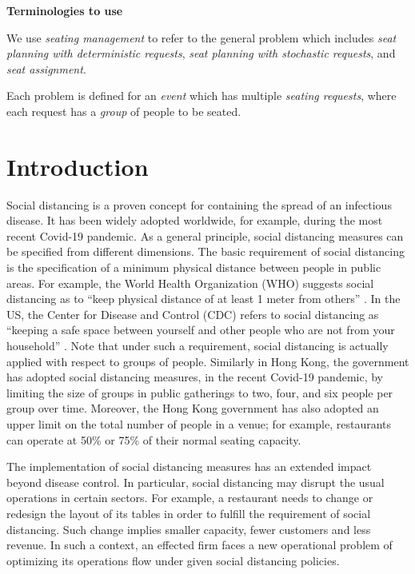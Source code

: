 
{\bf Terminologies to use}

We use {\em seating management} to refer to the general problem which includes {\em seat planning with deterministic requests}, 
{\em seat planning with stochastic requests}, and {\em seat assignment}.

Each problem is defined for an {\em event} which has multiple {\em seating requests}, where each request has a {\em group} of people to be seated.

\section{Introduction}
Social distancing is a proven concept for containing the spread of an infectious disease. It has been widely adopted worldwide, for example, during the most recent Covid-19 pandemic. As a general principle, social distancing measures can be specified from different dimensions. The basic requirement of social distancing is the specification of a minimum physical distance between people in public areas. For example, the World Health Organization (WHO) suggests social distancing as to ``keep physical distance of at least 1 meter from others'' \cite{AdviceforPublic}. In the US, the Center for Disease and Control (CDC) refers to social distancing as ``keeping a safe space between yourself and other people who are not from your household'' \cite{CDC}. 
Note that under such a requirement, social distancing is actually applied with respect to groups of people. Similarly in Hong Kong, the government has adopted social distancing measures, in the recent Covid-19 pandemic, by limiting the size of groups in public gatherings to two, four, and six people per group over time. Moreover, the Hong Kong government has also adopted an upper limit on the total number of people in a venue; for example, restaurants can operate at 50\% or 75\% of their normal seating capacity. 

The implementation of social distancing measures has an extended impact beyond disease control. In particular, social distancing may disrupt the usual operations in certain sectors. For example, a restaurant needs to change or redesign the layout of its tables in order to fulfill the requirement of social distancing. Such change implies smaller capacity, fewer customers and less revenue. In such a context, an effected firm faces a new operational problem of optimizing its operations flow under given social distancing policies.

